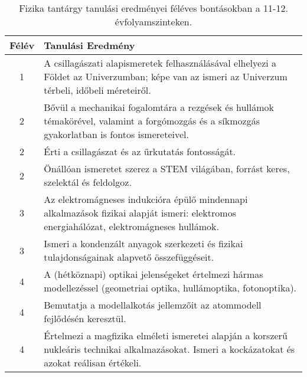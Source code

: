        
           \begin{longtable}{c | p{} }
            \caption[Fizika 11-12.]{Fizika tantárgy tanulási eredményei féléves bontásokban a 11-12. évfolyamszinteken. }  \\

            \textbf{Félév} & \textbf{Tanulási Eredmény} \\
            \hline
            \endhead
                                
                                          1 &  A csillagászati alapismeretek felhasználásával elhelyezi a Földet az Univerzumban; képe van az ismeri az Univerzum térbeli, időbeli méreteiről. \\ \hline
                                      
                                
                                          2 &  Bővül a mechanikai fogalomtára a rezgések és hullámok témakörével, valamint a forgómozgás és a síkmozgás gyakorlatban is fontos ismereteivel. \\ \hline
                                          2 &  Érti a csillagászat és az űrkutatás fontosságát. \\ \hline
                                          2 &  Önállóan ismeretet szerez a STEM világában, forrást keres, szelektál és feldolgoz. \\ \hline
                                      
                                
                                          3 &  Az elektromágneses indukcióra épülő mindennapi alkalmazások fizikai alapját ismeri: elektromos energiahálózat, elektromágneses hullámok. \\ \hline
                                          3 &  Ismeri a kondenzált anyagok szerkezeti és fizikai tulajdonságainak alapvető összefüggéseit. \\ \hline
                                      
                                
                                          4 &  A (hétköznapi) optikai jelenségeket értelmezi hármas modellezéssel (geometriai optika, hullámoptika, fotonoptika). \\ \hline
                                          4 &  Bemutatja a modellalkotás jellemzőit az atommodell fejlődésén keresztül. \\ \hline
                                          4 &  Értelmezi a magfizika elméleti ismeretei alapján a korszerű nukleáris technikai alkalmazásokat. Ismeri a kockázatokat és azokat reálisan értékeli. \\ \hline
                                      
                        \end{longtable}
            \clearpage

